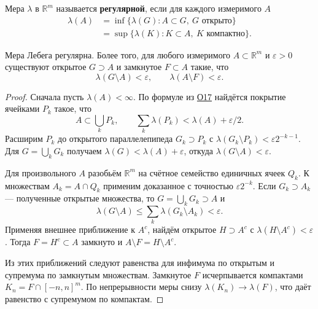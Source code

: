 \label{ticket:24}

\begin{definition}
Мера $\lambda$ в $\mathbb R^m$ называется \textbf{регулярной}, если для каждого измеримого $A$
\[
  \begin{aligned}
  \lambda(A)&=\inf\{\lambda(G):A\subset G,\ G\text{ открыто}\}\\
            &=\sup\{\lambda(K):K\subset A,\ K\text{ компактно}\}.
  \end{aligned}
\]
\end{definition}

\begin{theorem}
Мера Лебега регулярна.
Более того, для любого измеримого $A\subset\mathbb R^m$ и $\varepsilon>0$ существуют открытое $G\supset A$ и замкнутое $F\subset A$ такие, что
\[
  \lambda(G\setminus A)<\varepsilon,
  \qquad\lambda(A\setminus F)<\varepsilon.
\]
\end{theorem}

\begin{proof}
Сначала пусть $\lambda(A)<\infty$.
По формуле из \hyperref[definition:17]{О17} найдётся покрытие ячейками $P_k$ такое, что
\[
  A\subset\bigcup_k P_k,
  \qquad\sum_k\lambda(P_k)<\lambda(A)+\varepsilon/2.
\]
Расширим $P_k$ до открытого параллелепипеда $G_k\supset P_k$ с $\lambda(G_k\setminus P_k)<\varepsilon2^{-k-1}$.
Для $G=\bigcup_k G_k$ получаем $\lambda(G)<\lambda(A)+\varepsilon$, откуда $\lambda(G\setminus A)<\varepsilon$.

Для произвольного $A$ разобьём $\mathbb R^m$ на счётное семейство единичных ячеек $Q_k$.
К множествам $A_k=A\cap Q_k$ применим доказанное с точностью $\varepsilon2^{-k}$.
Если $G_k\supset A_k$ --- полученные открытые множества, то $G=\bigcup_k G_k\supset A$ и
\[
  \lambda(G\setminus A)\le\sum_k\lambda(G_k\setminus A_k)<\varepsilon.
\]
Применяя внешнее приближение к $A^c$, найдём открытое $H\supset A^c$ с $\lambda(H\setminus A^c)<\varepsilon$.
Тогда $F=H^c\subset A$ замкнуто и $A\setminus F=H\setminus A^c$.

Из этих приближений следуют равенства для инфимума по открытым и супремума по замкнутым множествам.
Замкнутое $F$ исчерпывается компактами $K_n=F\cap[-n,n]^m$.
По непрерывности меры снизу $\lambda(K_n)\to\lambda(F)$, что даёт равенство с супремумом по компактам.
\end{proof}
